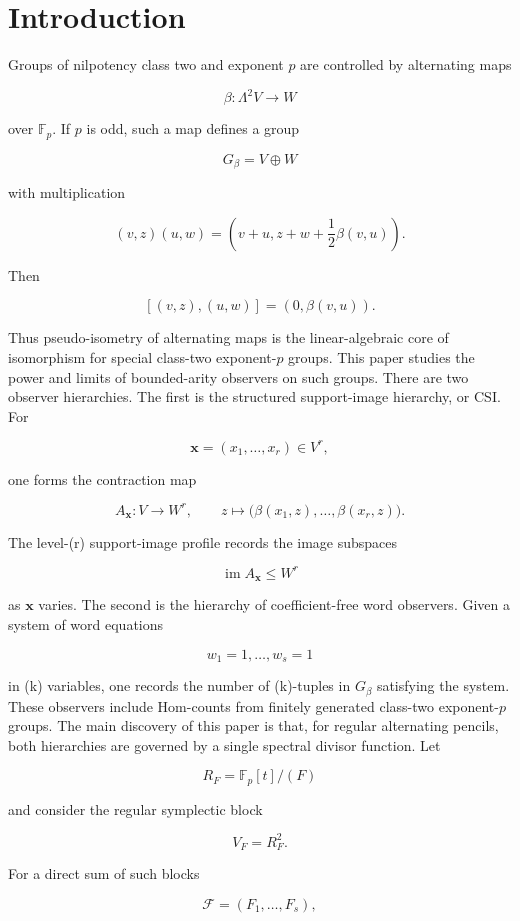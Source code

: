 \documentclass[11pt]{article}
\begin{document}
\section{Introduction}

Groups of nilpotency class two and exponent $p$ are controlled by alternating maps

\[
\beta:\Lambda^2V\to W
\]

over $\mathbb F_p$. If $p$ is odd, such a map defines a group

\[
G_\beta=V\oplus W
\]

with multiplication

\[
(v,z)(u,w)=
\left(
v+u,
z+w+\frac12\beta(v,u)
\right).
\]

Then

\[
[(v,z),(u,w)]=(0,\beta(v,u)).
\]

Thus pseudo-isometry of alternating maps is the linear-algebraic core of isomorphism for special class-two exponent-$p$ groups. This paper studies the power and limits of bounded-arity observers on such groups. There are two observer hierarchies. The first is the structured support-image hierarchy, or CSI. For

\[
\mathbf x=(x_1,\ldots,x_r)\in V^r,
\]

one forms the contraction map

\[
A_{\mathbf x}:V\to W^r,
\qquad
z\mapsto
\bigl(\beta(x_1,z),\ldots,\beta(x_r,z)\bigr).
\]

The level-(r) support-image profile records the image subspaces

\[
\operatorname{im}A_{\mathbf x}\le W^r
\]

as $\mathbf x$ varies. The second is the hierarchy of coefficient-free word observers. Given a system of word equations

\[
w_1=1,\ldots,w_s=1
\]

in (k) variables, one records the number of (k)-tuples in $G_\beta$ satisfying the system. These observers include Hom-counts from finitely generated class-two exponent-$p$ groups. The main discovery of this paper is that, for regular alternating pencils, both hierarchies are governed by a single spectral divisor function. Let

\[
R_F=\mathbb F_p[t]/(F)
\]

and consider the regular symplectic block

\[
V_F=R_F^2.
\]

For a direct sum of such blocks

\[
\mathcal F=(F_1,\ldots,F_s),
\]
\end{document}
